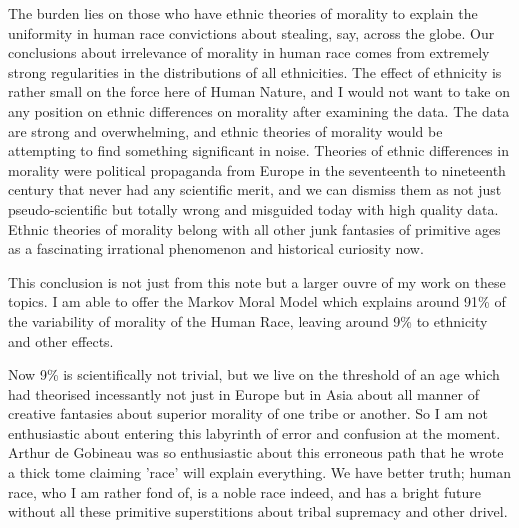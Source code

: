 \documentclass{amsart}
\begin{document}
The burden lies on those who have ethnic theories of morality to explain the uniformity in human race convictions about stealing, say, across the globe.  Our conclusions about irrelevance of morality in human race comes from extremely strong regularities in the distributions of all ethnicities. The effect of ethnicity is rather small on the force here of Human Nature, and I would not want to take on any position on ethnic differences on morality after examining the data.  The data are strong and overwhelming, and ethnic theories of morality would be attempting to find something significant in noise.  Theories of ethnic differences in morality were political propaganda from Europe in the seventeenth to nineteenth century that never had any scientific merit, and we can dismiss them as not just pseudo-scientific but totally wrong and misguided today with high quality data.  Ethnic theories of morality belong with all other junk fantasies of primitive ages as a fascinating irrational phenomenon and historical curiosity now.

This conclusion is not just from this note but a larger ouvre of my work on these topics.  I am able to offer the Markov Moral Model which explains around 91\% of the variability of morality of the Human Race, leaving around 9\% to ethnicity and other effects.  

Now 9\% is scientifically not trivial, but we live on the threshold of an age which had theorised incessantly not just in Europe but in Asia about all manner of creative fantasies about superior morality of one tribe or another.  So I am not enthusiastic about entering this labyrinth of error and confusion at the moment.  Arthur de Gobineau was so enthusiastic about this erroneous path that he wrote a thick tome claiming 'race' will explain everything.  We have better truth; human race, who I am rather fond of, is a noble race indeed, and has a bright future without all these primitive superstitions about tribal supremacy and other drivel.
\end{document}
